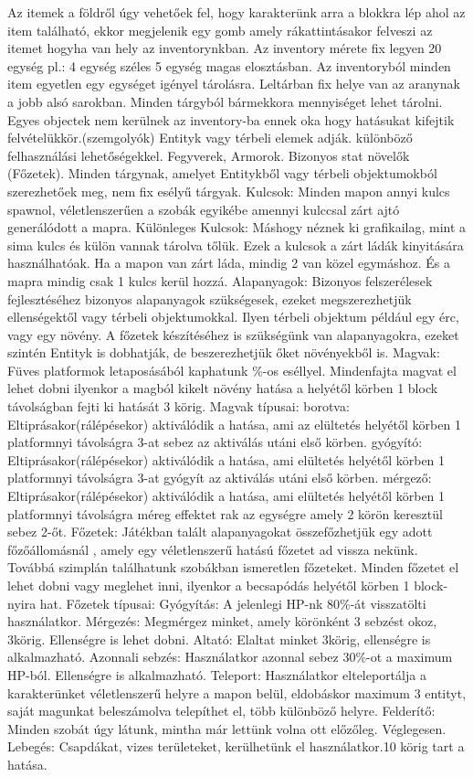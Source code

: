 Az itemek a földről úgy vehetőek fel, hogy karakterünk arra a blokkra lép ahol az item található, ekkor megjelenik egy gomb amely rákattintásakor felveszi az itemet hogyha van hely az inventorynkban.
Az inventory mérete fix legyen 20 egység pl.: 4 egység széles 5 egység magas elosztásban.
Az inventoryból minden item egyetlen egy egységet igényel tárolásra.
Leltárban fix helye van az aranynak a jobb alsó sarokban.
Minden tárgyból bármekkora mennyiséget lehet tárolni.
Egyes objectek nem kerülnek az inventory-ba ennek oka hogy hatásukat kifejtik felvételükkör.(szemgolyók)
Entityk vagy térbeli elemek adják.
különböző felhasználási lehetőségekkel.
Fegyverek, Armorok.
Bizonyos stat növelők (Főzetek).
Minden tárgynak, amelyet Entitykből vagy térbeli objektumokból szerezhetőek meg, nem fix esélyű tárgyak.
Kulcsok:
Minden mapon annyi kulcs spawnol, véletlenszerűen a szobák egyikébe amennyi kulccsal zárt ajtó generálódott a mapra.
Különleges Kulcsok:
Máshogy néznek ki grafikailag, mint a sima kulcs és külön vannak tárolva tőlük. Ezek a kulcsok a zárt ládák kinyitására használhatóak.
Ha a mapon van zárt láda, mindig 2 van közel egymáshoz. És a mapra mindig csak 1 kulcs kerül hozzá.
Alapanyagok:
Bizonyos felszerélesek fejlesztéséhez bizonyos alapanyagok szükségesek, ezeket megszerezhetjük ellenségektől vagy térbeli objektumokkal.
Ilyen térbeli objektum például egy érc, vagy egy növény.
A főzetek készítéséhez is szükségünk van alapanyagokra, ezeket szintén Entityk is dobhatják, de beszerezhetjük őket növényekből is.
Magvak:
Füves platformok letaposásából kaphatunk \%-os eséllyel. 
Mindenfajta magvat el lehet dobni ilyenkor a magból kikelt növény hatása a helyétől körben 1 block távolságban fejti ki hatását 3 körig.
Magvak típusai:
borotva: Eltiprásakor(rálépésekor) aktiválódik a hatása, ami az elültetés helyétől körben 1 platformnyi távolságra 3-at sebez az aktiválás utáni első körben.
gyógyító: Eltiprásakor(rálépésekor) aktiválódik a hatása, ami elültetés helyétől körben 1 platformnyi távolságra 3-at gyógyít az aktiválás utáni első körben.
mérgező: Eltiprásakor(rálépésekor) aktiválódik a hatása, ami elültetés helyétől körben 1 platformnyi távolságra méreg effektet rak az egységre amely 2 körön keresztül sebez 2-őt.
Főzetek:
Játékban talált alapanyagokat összefőzhetjük egy adott főzőállomásnál , amely egy véletlenszerű hatású főzetet ad vissza nekünk.
Továbbá szimplán találhatunk szobákban ismeretlen főzeteket.
Minden főzetet el lehet dobni vagy meglehet inni, ilyenkor a becsapódás helyétől körben 1 block-nyira hat.
Főzetek típusai:
Gyógyítás: A jelenlegi HP-nk 80\%-át visszatölti használatkor.
Mérgezés: Megmérgez minket, amely körönként 3 sebzést okoz, 3körig. Ellenségre is lehet dobni.
Altató: Elaltat minket 3körig, ellenségre is alkalmazható.
Azonnali sebzés: Használatkor azonnal sebez 30\%-ot a maximum HP-ból. Ellenségre is alkalmazható.
Teleport: Használatkor elteleportálja a karakterünket véletlenszerű helyre a mapon belül, eldobáskor maximum 3 entityt, saját magunkat beleszámolva telepíthet el, több különböző helyre.
Felderítő: Minden szobát úgy látunk, mintha már lettünk volna ott előzőleg. Véglegesen.
Lebegés: Csapdákat, vizes területeket, kerülhetünk el használatkor.10 körig tart a hatása.

